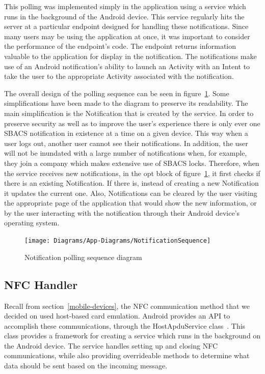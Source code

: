 \documentclass[12pt]{report}
\let\Oldsubsection\subsection
\renewcommand{\subsection}{\FloatBarrier\Oldsubsection}
\begin{document}
This polling was implemented simply in the application using a service which runs in the background of the Android
device. This service regularly hits the server at a particular endpoint designed for handling these notifications. Since
many users may be using the application at once, it was important to consider the performance of the endpoint's code.
The endpoint returns information valuable to the application for display in the notification. The notifications make use
of an Android notification's ability to launch an Activity with an Intent to take the user to the appropriate Activity
associated with the notification.

The overall design of the polling sequence can be seen in figure~\ref{fig:notfication-sequence}. Some simplifications
have been made to the diagram to preserve its readability. The main simplification is the Notification that is created
by the service. In order to preserve security as well as to improve the user's experience there is only ever one SBACS
notification in existence at a time on a given device. This way when a user logs out, another user cannot see their
notifications. In addition, the user will not be inundated with a large number of notifications when, for example, they
join a company which makes extensive use of SBACS locks. Therefore, when the service receives new notifications, in the
opt block of figure~\ref{fig:notfication-sequence}, it first checks if there is an existing Notification. If there is,
instead of creating a new Notification it updates the current one. Also, Notifications can be cleared by the user
visiting the appropriate page of the application that would show the new information, or by the user interacting with
the notification through their Android device's operating system.

\begin{figure}
    \centering
    \texttt{[image: Diagrams/App-Diagrams/NotificationSequence]}
    \caption{Notification polling sequence diagram}
    \label{fig:notfication-sequence}
\end{figure}


\subsection{NFC Handler} \label{nfc-handler}

Recall from section~\ref{mobile-devices}, the NFC communication method that we decided on used host-based card emulation. Android provides
an API to accomplish these communications, through the HostApduService class~\autocite{ANDROIDAPDU}. This class provides a framework for
creating a service which runs in the background on the Android device. The service handles setting up and closing NFC
communications, while also providing overrideable methods to determine what data should be sent based on the incoming
message.
\end{document}
